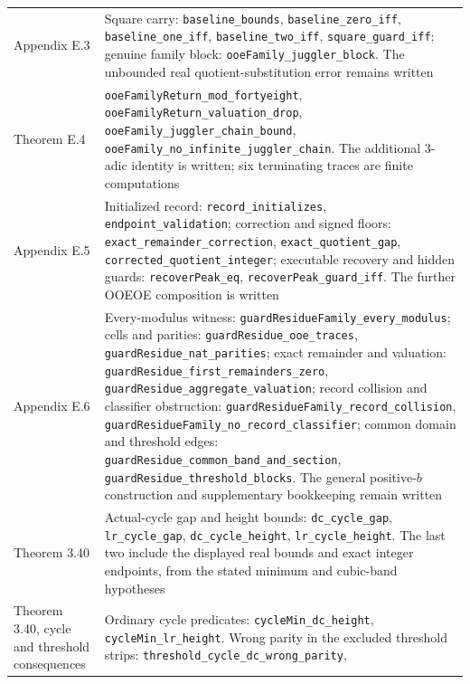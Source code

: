 \documentclass[12pt]{article}
\begin{document}
\begin{longtable}[]{@{}
  >{\raggedright\arraybackslash}p{}
  >{\raggedright\arraybackslash}p{}@{}}
Appendix E.3 & Square carry: \texttt{\nolinkurl{baseline_bounds}},
\texttt{\nolinkurl{baseline_zero_iff}},
\texttt{\nolinkurl{baseline_one_iff}},
\texttt{\nolinkurl{baseline_two_iff}},
\texttt{\nolinkurl{square_guard_iff}}; genuine family block:
\texttt{\nolinkurl{ooeFamily_juggler_block}}. The unbounded real
quotient-substitution error remains written \\
Theorem E.4 & \texttt{\nolinkurl{ooeFamilyReturn_mod_fortyeight}},
\texttt{\nolinkurl{ooeFamilyReturn_valuation_drop}},
\texttt{\nolinkurl{ooeFamily_juggler_chain_bound}},
\texttt{\nolinkurl{ooeFamily_no_infinite_juggler_chain}}. The additional
3-adic identity is written; six terminating traces are finite
computations \\
Appendix E.5 & Initialized record:
\texttt{\nolinkurl{record_initializes}},
\texttt{\nolinkurl{endpoint_validation}}; correction and signed floors:
\texttt{\nolinkurl{exact_remainder_correction}},
\texttt{\nolinkurl{exact_quotient_gap}},
\texttt{\nolinkurl{corrected_quotient_integer}}; executable recovery and
hidden guards: \texttt{\nolinkurl{recoverPeak_eq}},
\texttt{\nolinkurl{recoverPeak_guard_iff}}. The further OOEOE
composition is written \\
Appendix E.6 & Every-modulus witness:
\texttt{\nolinkurl{guardResidueFamily_every_modulus}}; cells and
parities: \texttt{\nolinkurl{guardResidue_ooe_traces}},
\texttt{\nolinkurl{guardResidue_nat_parities}}; exact remainder and
valuation: \texttt{\nolinkurl{guardResidue_first_remainders_zero}},
\texttt{\nolinkurl{guardResidue_aggregate_valuation}}; record collision
and classifier obstruction:
\texttt{\nolinkurl{guardResidueFamily_record_collision}},
\texttt{\nolinkurl{guardResidueFamily_no_record_classifier}}; common
domain and threshold edges:
\texttt{\nolinkurl{guardResidue_common_band_and_section}},
\texttt{\nolinkurl{guardResidue_threshold_blocks}}. The general
positive-\(b\) construction and supplementary bookkeeping remain
written \\
Theorem 3.40 & Actual-cycle gap and height bounds:
\texttt{\nolinkurl{dc_cycle_gap}}, \texttt{\nolinkurl{lr_cycle_gap}},
\texttt{\nolinkurl{dc_cycle_height}},
\texttt{\nolinkurl{lr_cycle_height}}. The last two include the displayed
real bounds and exact integer endpoints, from the stated minimum and
cubic-band hypotheses \\
Theorem 3.40, cycle and threshold consequences & Ordinary cycle
predicates: \texttt{\nolinkurl{cycleMin_dc_height}},
\texttt{\nolinkurl{cycleMin_lr_height}}. Wrong parity in the excluded
threshold strips: \texttt{\nolinkurl{threshold_cycle_dc_wrong_parity}},

\end{longtable}
\end{document}
